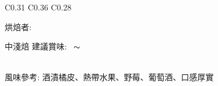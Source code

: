 \documentclass[10pt,a4paper]{article}
\begin{document}
\begin{tabular}{C{0.31\textwidth} C{0.36\textwidth} C{0.28\textwidth}}
{{烘焙者: \textbf{\scriptsize{}}}\vspace*{-0.3em}\\
 \addtocounter{datenumber}{
5 }%
\setdatebynumber{\thedatenumber} 
{\normalsize 
中淺焙%
\enskip \scriptsize 建議賞味:} \scriptsize{\datemonthname ~\thedateday}$\thicksim$\addtocounter{datenumber}{55}\setdatebynumber{\thedatenumber} \datedate
\\\scriptsize 風味參考: 酒漬橘皮、熱帶水果、野莓、葡萄酒、口感厚實
%
} \tabularnewline
\shortstack[c]{
%
\hspace*{1.3cm} { \vspace*{-0.68cm}\Large 
}}
\end{tabular}
\end{document}

